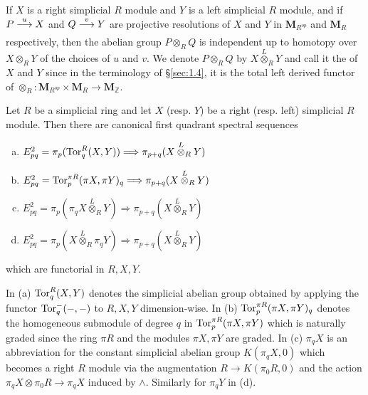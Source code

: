 \documentclass[../main]{subfiles}
\begin{document}
If $X$ is a right simplicial $R$ module and $Y$ is a left simplicial $R$ module, and if $P\varrightarrow{u}X$ and $Q\varrightarrow{v}Y$ are projective resolutions of $X$ and $Y$ in $\mathbf{M}_{R^{op}}$ and $\mathbf{M}_R$ respectively, then the abelian group $P\otimes_RQ$ is independent up to homotopy over $X\otimes_{R}Y$ of the choices of $u$ and $v$. We denote $P\otimes_RQ$ by $X\overset{L}{\otimes}_RY$ and call it the  of $X$ and $Y$ since in the terminology of \S\ref{sec:1.4}, it is the total left derived functor of $\otimes_R:\mathbf{M}_{R^{op}}\times\mathbf{M}_R\longrightarrow\mathbf{M}_{\mathbb{Z}}$.

\begin{theorem}
\label{thm:2.6}
Let $R$ be a simplicial ring and let $X$ (resp. $Y$) be a right (resp. left) simplicial $R$ module. Then there are canonical first quadrant spectral sequences
\begin{enumerate}[(a)]
    \item\label{2.6.a} $E^2_{pq}=\pi_p(\operatorname{Tor}^R_q(X,Y))\Longrightarrow\pi_{p+q}(X\overset{L}{\otimes}_R Y)$
    \item\label{2.6.b} $E^2_{pq}=\operatorname{Tor}^{\pi R}_p(\pi X,\pi Y)_q\Longrightarrow\pi_{p+q}(X\overset{L}{\otimes}_R Y)$
    \item\label{2.6.c} $E^2_{pq}=\pi_p(\pi_qX\overset{L}{\otimes}_RY)\Longrightarrow\pi_{p+q}(X\overset{L}{\otimes}_R Y)$
    \item\label{2.6.d} $E^2_{pq}=\pi_p(X\overset{L}{\otimes}_R\pi_qY)\Longrightarrow\pi_{p+q}(X\overset{L}{\otimes}_R Y)$
\end{enumerate}
which are functorial in $R,X,Y$.
\end{theorem}

In (a) $\operatorname{Tor}^R_q(X,Y)$ denotes the simplicial abelian group obtained by applying the functor $\operatorname{Tor}_q^{-}(-,-)$ to $R,X,Y$ dimension-wise. In (b) $\operatorname{Tor}^{\pi R}_p(\pi X,\pi Y)_q$ denotes the homogeneous submodule of degree $q$ in $\operatorname{Tor}^{\pi R}_p(\pi X,\pi Y)$ which is naturally graded since the ring $\pi R$ and the modules $\pi X,\pi Y$ are graded. In (c) $\pi_qX$ is an abbreviation for the constant simplicial abelian group $K(\pi_qX,0)$ which becomes a right $R$ module via the augmentation $R\longrightarrow K(\pi_0 R,0)$ and the action $\pi_qX\otimes\pi_0 R\longrightarrow\pi_qX$ induced by $\wedge $. Similarly for $\pi_qY$ in (d).
\end{document}
